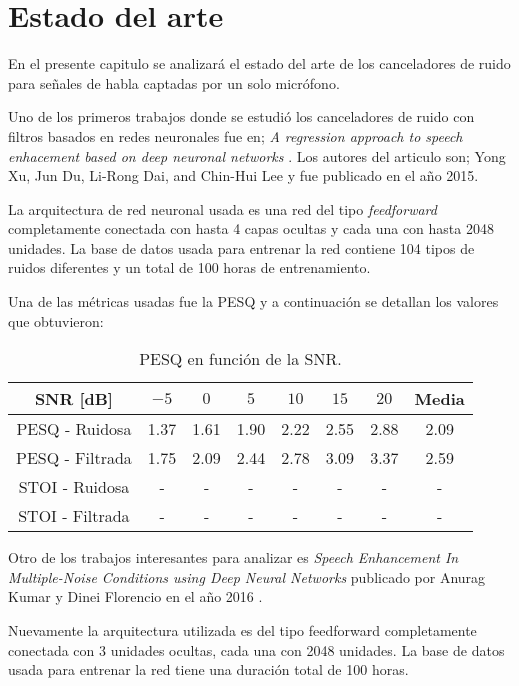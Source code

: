 \section{Estado del arte}

En el presente capitulo se analizará el estado del arte de los canceladores de ruido para señales de habla captadas por un solo micrófono.

Uno de los primeros trabajos donde se estudió los canceladores de ruido con filtros basados en redes neuronales fue en; \emph{A regression approach to speech enhacement based on deep neuronal networks} \cite{a_regression_approach_to_speech_enhancement_based_on_deep_neural_networks}. Los autores del articulo son; Yong Xu, Jun Du, Li-Rong Dai, and Chin-Hui Lee y fue publicado en el año 2015.

La arquitectura de red neuronal usada es una red del tipo \emph{feedforward} completamente conectada con hasta 4 capas ocultas y cada una con hasta 2048 unidades. La base de datos usada para entrenar la red contiene 104 tipos de ruidos diferentes y un total de 100 horas de entrenamiento.

Una de las métricas usadas fue la PESQ y a continuación se detallan los valores que obtuvieron:

\begin{table}[H]
	\centering
	\begin{tabular}{ |c|c|c|c|c|c|c|c| } 
		\hline
		SNR [dB] & $-5$ & $0$ & $5$ & $10$ & $15$ & $20$ & Media \\ 
		\hline
		PESQ - Ruidosa & 1.37 & 1.61 & 1.90 & 2.22 & 2.55 & 2.88 & 2.09 \\
		PESQ - Filtrada & 1.75 & 2.09 & 2.44 & 2.78 & 3.09 & 3.37 & 2.59 \\
		STOI - Ruidosa & - & - & - & - & - & - & - \\
		STOI - Filtrada & - & - & - & - & - & - & - \\
		\hline
	\end{tabular}
	\caption{PESQ en función de la SNR.}
\end{table}

Otro de los trabajos interesantes para analizar es \emph{Speech Enhancement In Multiple-Noise Conditions using Deep Neural Networks} publicado por Anurag Kumar y Dinei Florencio en el año 2016 \cite{speech_enhancement_in_multiple_moise_conditions_using_deep_neural_networks}.

Nuevamente la arquitectura utilizada es del tipo feedforward completamente conectada con 3 unidades ocultas, cada una con 2048 unidades. La base de datos usada para entrenar la red tiene una duración total de 100 horas. 

